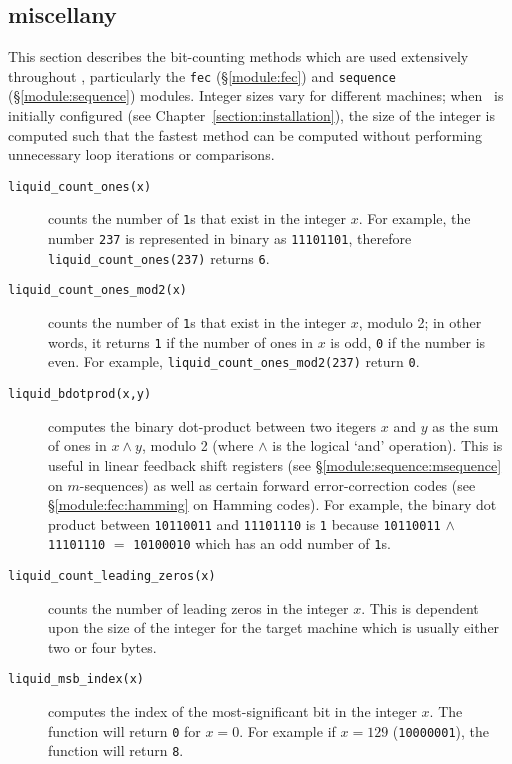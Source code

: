 \subsection{miscellany}
\label{module:utility:misc}
This section describes the bit-counting methods which are used extensively
throughout \liquid, particularly the
{\tt fec} (\S\ref{module:fec}) and
{\tt sequence} (\S\ref{module:sequence}) modules.
Integer sizes vary for different machines;
when \liquid\ is initially configured (see Chapter~\ref{section:installation}), the
size of the integer is computed such that the fastest method can be computed
without performing unnecessary loop iterations or comparisons.

\begin{description}
\item[{\tt liquid\_count\_ones(x)}]
    counts the number of {\tt 1}s that exist in the integer $x$.
    For example, the number {\tt 237} is represented in binary as
    {\tt 11101101}, therefore {\tt liquid\_count\_ones(237)} returns {\tt 6}.
\item[{\tt liquid\_count\_ones\_mod2(x)}]
    counts the number of {\tt 1}s that exist in the integer $x$, modulo 2; in
    other words, it returns {\tt 1} if the number of ones in $x$ is odd,
    {\tt 0} if the number is even.
    For example, {\tt liquid\_count\_ones\_mod2(237)} return {\tt 0}.
\item[{\tt liquid\_bdotprod(x,y)}]
    computes the binary dot-product between two itegers $x$ and $y$ as the sum
    of ones in $x \land y$, modulo 2 (where $\land$ is the logical `and'
    operation).
    This is useful in linear feedback shift registers
    (see \S\ref{module:sequence:msequence} on $m$-sequences)
    as well as certain forward error-correction codes
    (see \S\ref{module:fec:hamming} on Hamming codes).
    For example, the binary dot product between
    {\tt 10110011} and
    {\tt 11101110} is
    {\tt 1} because
    {\tt 10110011} $\land$ {\tt 11101110} $=$ {\tt 10100010} which has an odd
    number of {\tt 1}s.
\item[{\tt liquid\_count\_leading\_zeros(x)}]
    counts the number of leading zeros in the integer $x$.
    This is dependent upon the size of the integer for the target machine
    which is usually either two or four bytes.
\item[{\tt liquid\_msb\_index(x)}]
    computes the index of the most-significant bit in the integer $x$.
    The function will return {\tt 0} for $x=0$.
    For example if $x=129$ ({\tt 10000001}), the function will return {\tt 8}.
\end{description}


